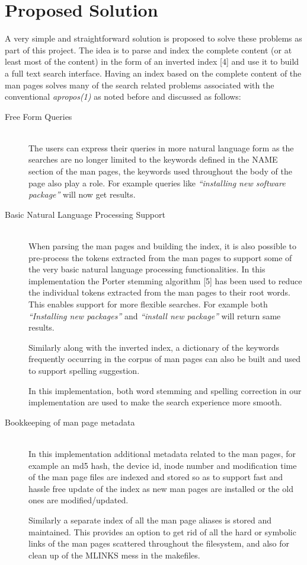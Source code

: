 \documentclass[titlepage, a4paper, 12pt]{article}
\begin{document}
\section{Proposed Solution}
A very simple and straightforward solution is proposed to solve these problems as
part of this project.
The idea is to parse and index
the complete content (or at least most of the content) in the form of an
inverted index [4] and use it to build a full text search
interface. Having an index based on the complete content of the man pages solves
many of the search
related problems associated with the conventional \textit{apropos(1)} as noted
before and discussed as follows:
\begin{description}
\item[Free Form Queries] \hfill \\
The users can express their queries in more natural language form as the searches
are no longer limited to the keywords defined in the NAME section of the man
pages, the keywords used throughout the body of the page also play a role.
For example queries like \textit{``installing new software package''}
will now get results.
\end{description}
\begin{description}
\item[Basic Natural Language Processing Support] \hfill \\
When parsing the man pages and building the index, it is also possible to
pre-process the tokens extracted from the man pages to support some of the very
basic natural language processing functionalities. In this implementation the
Porter stemming algorithm [5] has been used to
reduce the individual tokens extracted from the man pages to their root words.
This enables support for more flexible searches. For example both
\textit{``Installing new packages''} and \textit{``install new package''} will
return same results.

Similarly along with the inverted index, a dictionary of the keywords frequently
occurring in the corpus of man pages can also be built and used to support
spelling suggestion.

In this implementation, both word stemming and spelling correction in our implementation are used to make the search experience more smooth.
\end{description}
\begin{description}
\item[Bookkeeping of man page metadata] \hfill \\
In this implementation additional metadata related to the man pages, for example
an md5 hash, the device id, inode number and modification time
of the man page files are indexed and stored so
as to support fast and hassle free update of the index as new man pages are
installed or the old ones are modified/updated.

Similarly a separate index of all the man page aliases is stored and maintained.
This provides an option to get rid of all the hard or symbolic links of the man
pages scattered throughout the filesystem, and also for clean up of the MLINKS
mess in the makefiles.
\end{description}
\end{document}

